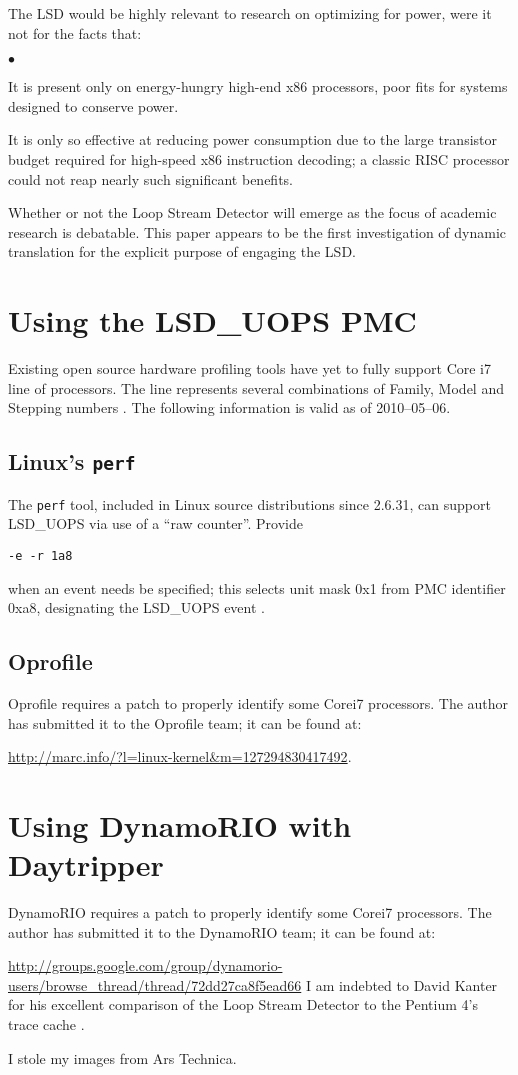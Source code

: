 \documentclass[]{sigplanconf}
\newcommand{\squishlist}{\begin{list}{$\bullet$}
  {\setlength{\itemsep}{0pt}
    \setlength{\parsep}{3pt}
    \setlength{\topsep}{3pt}
    \setlength{\partopsep}{0pt}
    \setlength{\leftmargin}{1.5em}
    \setlength{\labelwidth}{1em}
    \setlength{\labelsep}{0.5em}}}
\newcommand{\squishend}{\end{list}}
\begin{document}
The LSD would be highly relevant to research on optimizing for power, were it
not for the facts that:
\squishlist
\item It is present only on energy-hungry high-end x86 processors, poor fits for
systems designed to conserve power.
\item It is only so effective at reducing power consumption due to the large
transistor budget required for high-speed x86 instruction decoding; a classic
RISC processor could not reap nearly such significant benefits.
\squishend
Whether or not the Loop Stream Detector will emerge as the focus of academic
research is debatable. This paper appears to be the first investigation
of dynamic translation for the explicit purpose of engaging the LSD.
\appendix
\section{Using the LSD\_UOPS PMC}

Existing open source hardware profiling tools have yet to fully support Core\texttrademark
i7 line of processors. The line represents several combinations of Family,
Model and Stepping numbers \cite{intelcpuid}. The following information is valid
as of 2010--05--06.
\subsection{Linux's \texttt{perf}}
The \texttt{perf} tool, included in Linux source distributions since 2.6.31,
can support LSD\_UOPS via use of a ``raw counter''. Provide

\vspace{5mm}
\texttt{-e -r 1a8}
\vspace{5mm}

when an event needs be specified; this selects unit mask 0x1 from PMC identifier
0xa8, designating the LSD\_UOPS event \cite{intelsys}.
\subsection{Oprofile}
Oprofile requires a patch to properly identify some Core\texttrademark i7
processors. The author has submitted it to the Oprofile team; it can be found
at:

\url{http://marc.info/?l=linux-kernel&m=127294830417492}.
\section{Using DynamoRIO with Daytripper}
DynamoRIO requires a patch to properly identify some Core\texttrademark i7
processors. The author has submitted it to the DynamoRIO team; it can be found
at:

\url{http://groups.google.com/group/dynamorio-users/browse_thread/thread/72dd27ca8f5ead66}
\acks
I am indebted to David Kanter for his excellent comparison of the Loop Stream
Detector to the Pentium 4's trace cache \cite{kanter}.

I stole my images from Ars Technica.



\end{document}
